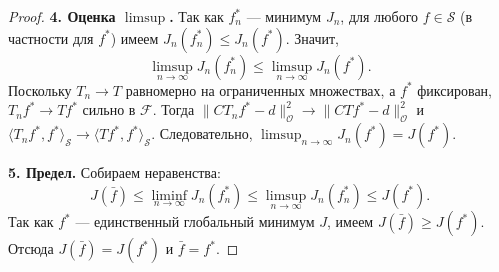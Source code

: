 \documentclass[sn-mathphys-num]{bst/sn-jnl}
\theoremstyle{thmstylethree}
\theoremstyle{thmstyletwo}
\theoremstyle{thmstyleone}
\begin{document}
\begin{proof}
\textbf{4. Оценка $\limsup$.}
Так как $f_n^*$ — минимум $J_n$, для любого $f \in \mathcal{S}$ (в частности для $f^*$) имеем $J_n(f_n^*) \le J_n(f^*)$. Значит,
\begin{equation}
    \limsup_{n\to\infty} J_n(f_n^*) \le \limsup_{n\to\infty} J_n(f^*).
\end{equation}
Поскольку $T_n \to T$ равномерно на ограниченных множествах, а $f^*$ фиксирован, $T_n f^* \to T f^*$ сильно в $\mathcal{F}$. Тогда $\|C T_n f^* - d\|_{\mathcal{O}}^2 \to \|C T f^* - d\|_{\mathcal{O}}^2$ и $\langle T_n f^*, f^*\rangle_{\mathcal{S}} \to \langle T f^*, f^*\rangle_{\mathcal{S}}$. Следовательно, $\limsup_{n\to\infty} J_n(f^*) = J(f^*)$.

\textbf{5. Предел.}
Собираем неравенства:
\begin{equation}
    J(\bar f) \le \liminf_{n\to\infty} J_n(f_n^*) \le \limsup_{n\to\infty} J_n(f_n^*) \le J(f^*).
\end{equation}
Так как $f^*$ — единственный глобальный минимум $J$, имеем $J(\bar f) \ge J(f^*)$. Отсюда $J(\bar f) = J(f^*)$ и $\bar f = f^*$.


\end{proof}
\end{document}
